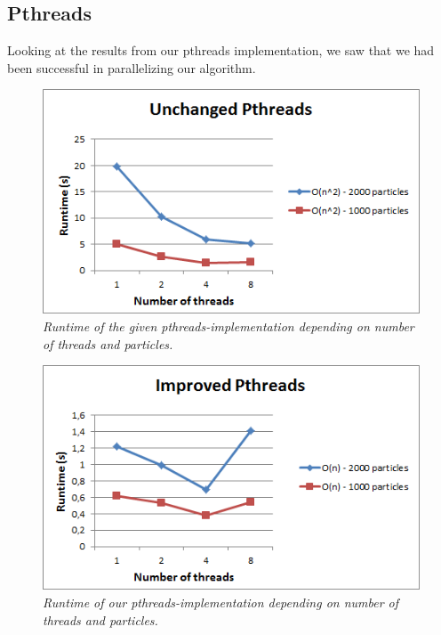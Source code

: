 \documentclass[11pt,a4paper]{article}
\begin{document}
\subsection{Pthreads}
Looking at the results from our pthreads implementation, we saw that we had been successful in parallelizing our algorithm. \newpage
\vspace{10pt}
\begin{figure}[htb]
\centering
\includegraphics[scale=0.8]{pics/pth1.png}
\caption{\emph{Runtime of the given pthreads-implementation depending on number of threads and particles.}}
\label{fig:gird}
\end{figure}
\vspace{10pt}

\begin{figure}[htb]
\centering
\includegraphics[scale=0.8]{pics/pth2.png}
\caption{\emph{Runtime of our pthreads-implementation depending on number of threads and particles.}}
\label{fig:gird}
\end{figure}
\newpage
\end{document}
